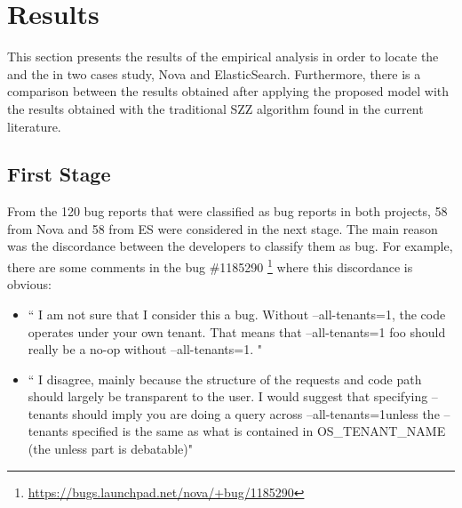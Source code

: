 \documentclass[a4paper, 12pt]{book}
\begin{document}
%
%

\section{Results}
\label{sec:results}
This section presents the results of the empirical analysis in order to locate the \BIC and the \FFC in two cases study, Nova and ElasticSearch. Furthermore, there is a comparison between the results obtained after applying the proposed model with the results obtained with the traditional SZZ algorithm found in the current literature.

\subsection{First Stage}
\label{sec:resultsFS}


From the 120 bug reports that were classified as bug reports in both projects, 58 from Nova and 58 from ES were considered in the next stage. The main reason was the discordance between the developers to classify them as bug. For example, there are some comments in the bug \#1185290 \footnote{\url{https://bugs.launchpad.net/nova/+bug/1185290}} where this discordance is obvious:
	\begin{itemize}
		\item `` I am not sure that I consider this a bug. Without --all-tenants=1, the code operates under your own tenant. That means that --all-tenants=1 foo should really be a no-op without --all-tenants=1. "
		\item `` I disagree, mainly because the structure of the requests and code path should largely be transparent to the user. I would suggest that specifying --tenants should imply you are doing a query across --all-tenants=1unless the --tenants specified is the same as what is contained in OS\_TENANT\_NAME (the unless part is debatable)"
	\end{itemize}
\end{document}
